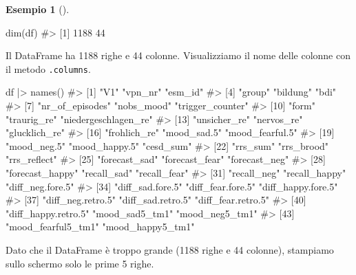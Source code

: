 \documentclass[
  letterpaper,
  DIV=11,
  numbers=noendperiod]{scrreprt}
\newenvironment{Shaded}{\begin{snugshade}}{\end{snugshade}}
\newcommand{\CommentTok}[1]{\textcolor[rgb]{0.37,0.37,0.37}{#1}}
\newcommand{\FunctionTok}[1]{\textcolor[rgb]{0.28,0.35,0.67}{#1}}
\newcommand{\NormalTok}[1]{\textcolor[rgb]{0.00,0.23,0.31}{#1}}
\newcommand{\SpecialCharTok}[1]{\textcolor[rgb]{0.37,0.37,0.37}{#1}}
\theoremstyle{definition}
\newtheorem{example}{Esempio}[chapter]
\theoremstyle{remark}
\begin{document}
\begin{example}[]
\begin{Shaded}
\begin{Highlighting}[]
\FunctionTok{dim}\NormalTok{(df)}
\CommentTok{\#\textgreater{} [1] 1188   44}
\end{Highlighting}
\end{Shaded}

Il DataFrame ha 1188 righe e 44 colonne. Visualizziamo il nome delle
colonne con il metodo \texttt{.columns}.

\begin{Shaded}
\begin{Highlighting}[]
\NormalTok{df }\SpecialCharTok{|\textgreater{}} \FunctionTok{names}\NormalTok{()}
\CommentTok{\#\textgreater{}  [1] "V1"                  "vpn\_nr"              "esm\_id"             }
\CommentTok{\#\textgreater{}  [4] "group"               "bildung"             "bdi"                }
\CommentTok{\#\textgreater{}  [7] "nr\_of\_episodes"      "nobs\_mood"           "trigger\_counter"    }
\CommentTok{\#\textgreater{} [10] "form"                "traurig\_re"          "niedergeschlagen\_re"}
\CommentTok{\#\textgreater{} [13] "unsicher\_re"         "nervos\_re"           "glucklich\_re"       }
\CommentTok{\#\textgreater{} [16] "frohlich\_re"         "mood\_sad.5"          "mood\_fearful.5"     }
\CommentTok{\#\textgreater{} [19] "mood\_neg.5"          "mood\_happy.5"        "cesd\_sum"           }
\CommentTok{\#\textgreater{} [22] "rrs\_sum"             "rrs\_brood"           "rrs\_reflect"        }
\CommentTok{\#\textgreater{} [25] "forecast\_sad"        "forecast\_fear"       "forecast\_neg"       }
\CommentTok{\#\textgreater{} [28] "forecast\_happy"      "recall\_sad"          "recall\_fear"        }
\CommentTok{\#\textgreater{} [31] "recall\_neg"          "recall\_happy"        "diff\_neg.fore.5"    }
\CommentTok{\#\textgreater{} [34] "diff\_sad.fore.5"     "diff\_fear.fore.5"    "diff\_happy.fore.5"  }
\CommentTok{\#\textgreater{} [37] "diff\_neg.retro.5"    "diff\_sad.retro.5"    "diff\_fear.retro.5"  }
\CommentTok{\#\textgreater{} [40] "diff\_happy.retro.5"  "mood\_sad5\_tm1"       "mood\_neg5\_tm1"      }
\CommentTok{\#\textgreater{} [43] "mood\_fearful5\_tm1"   "mood\_happy5\_tm1"}
\end{Highlighting}
\end{Shaded}

Dato che il DataFrame è troppo grande (1188 righe e 44 colonne),
stampiamo sullo schermo solo le prime 5 righe.


\end{example}
\end{document}
